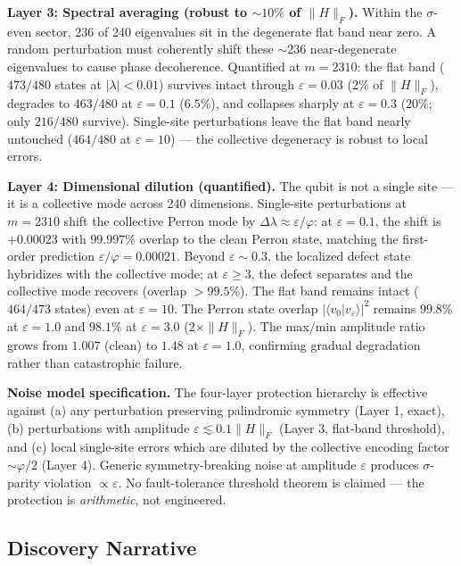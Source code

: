 \documentclass[11pt,letterpaper]{article}
\theoremstyle{definition}
\theoremstyle{remark}
\begin{document}
\textbf{Layer 3: Spectral averaging (robust to $\sim 10\%$ of $\|H\|_F$).} Within the $\sigma$-even sector, 236 of 240 eigenvalues sit in the degenerate flat band near zero. A random perturbation must coherently shift these $\sim 236$ near-degenerate eigenvalues to cause phase decoherence. Quantified at $m = 2310$: the flat band ($473/480$ states at $|\lambda| < 0.01$) survives intact through $\varepsilon = 0.03$ ($2\%$ of $\|H\|_F$), degrades to $463/480$ at $\varepsilon = 0.1$ ($6.5\%$), and collapses sharply at $\varepsilon = 0.3$ ($20\%$; only $216/480$ survive). Single-site perturbations leave the flat band nearly untouched ($464/480$ at $\varepsilon = 10$) --- the collective degeneracy is robust to local errors.

\textbf{Layer 4: Dimensional dilution (quantified).} The qubit is not a single site --- it is a collective mode across 240 dimensions. Single-site perturbations at $m=2310$ shift the collective Perron mode by $\Delta\lambda \approx \varepsilon/\varphi$: at $\varepsilon = 0.1$, the shift is $+0.00023$ with $99.997\%$ overlap to the clean Perron state, matching the first-order prediction $\varepsilon/\varphi = 0.00021$. Beyond $\varepsilon \sim 0.3$, the localized defect state hybridizes with the collective mode; at $\varepsilon \geq 3$, the defect separates and the collective mode recovers (overlap $> 99.5\%$). The flat band remains intact ($464/473$ states) even at $\varepsilon = 10$. The Perron state overlap $|\langle v_0 | v_\varepsilon \rangle|^2$ remains $99.8\%$ at $\varepsilon = 1.0$ and $98.1\%$ at $\varepsilon = 3.0$ ($2\times \|H\|_F$). The max/min amplitude ratio grows from $1.007$ (clean) to $1.48$ at $\varepsilon = 1.0$, confirming gradual degradation rather than catastrophic failure.

\textbf{Noise model specification.} The four-layer protection hierarchy is effective against (a) any perturbation preserving palindromic symmetry (Layer 1, exact), (b) perturbations with amplitude $\varepsilon \lesssim 0.1\|H\|_F$ (Layer 3, flat-band threshold), and (c) local single-site errors which are diluted by the collective encoding factor $\sim \varphi/2$ (Layer 4). Generic symmetry-breaking noise at amplitude $\varepsilon$ produces $\sigma$-parity violation $\propto \varepsilon$. No fault-tolerance threshold theorem is claimed --- the protection is \emph{arithmetic}, not engineered.

\subsection{Discovery Narrative}\label{discovery-narrative}
\end{document}
